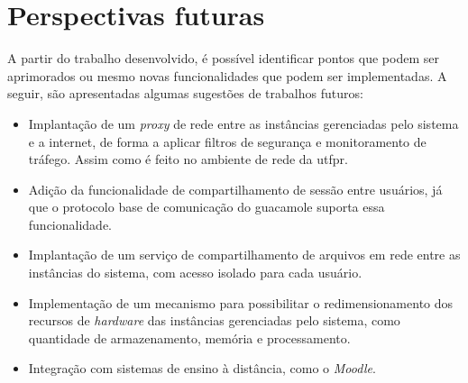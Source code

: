 \section{Perspectivas futuras}
\label{sec:perspectivasFuturas}

A partir do trabalho desenvolvido, é possível identificar pontos que podem ser aprimorados ou mesmo novas funcionalidades que podem ser implementadas. A seguir, são apresentadas algumas sugestões de trabalhos futuros:

\begin{itemize}
    \item Implantação de um \textit{proxy} de rede entre as instâncias gerenciadas pelo sistema e a internet, de forma a aplicar filtros de segurança e monitoramento de tráfego. Assim como é feito no ambiente de rede da \gls{utfpr}.

    \item Adição da funcionalidade de compartilhamento de sessão entre usuários, já que o protocolo base de comunicação do \gls{guacamole} suporta essa funcionalidade. 

    \item Implantação de um serviço de compartilhamento de arquivos em rede entre as instâncias do sistema, com acesso isolado para cada usuário.

    \item Implementação de um mecanismo para possibilitar o redimensionamento dos recursos de \textit{hardware} das instâncias gerenciadas pelo sistema, como quantidade de armazenamento, memória e processamento.

    \item Integração com sistemas de ensino à distância, como o \textit{Moodle}.
\end{itemize}